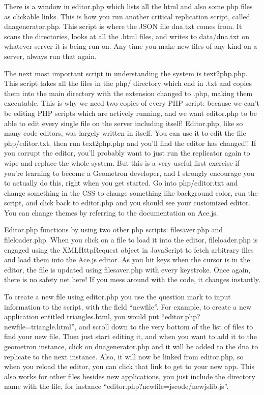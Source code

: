 There is a window in editor.php which lists all the html and also some php files as clickable links.  This is how you run another critical replication script, called dnagenerator.php.  This script is where the JSON file dna.txt comes from.  It scans the directories, looks at all the .html files, and writes to data/dna.txt on whatever server it is being run on.  Any time you make new files of any kind on a server, always run that again.  

The next most important script in understanding the system is text2php.php.  This script takes all the files in the php/ directory which end in .txt and copies them into the main directory with the extension changed to .php, making them executable.  This is why we need two copies of every PHP script: because we can't be editing PHP scripts which are actively running, and we want editor.php to be able to edit every single file on the server including itself! Editor.php, like so many code editors, was largely written in itself.  You can use it to edit the file php/editor.txt, then run text2php.php and you'll find the editor has changed!! If you corrupt the editor, you'll probably want to just run the replicator again to wipe and replace the whole system.  But this is a very useful first exercise if you're learning to become a Geometron developer, and I strongly encourage you to actually do this, right when you get started.  Go into php/editor.txt and change something in the CSS to change something like background color, run the script, and click back to editor.php and you should see your customized editor. You can change themes by referring to the documentation on Ace.js.

Editor.php functions by using two other php scripts: filesaver.php and fileloader.php.  When you click on a file to load it into the editor, fileloader.php is engaged using the XMLHttpRequest object in JavaScript to fetch arbitrary files and load them into the Ace.js editor.  As you hit keys when the cursor is in the editor, the file is updated using filesaver.php with every keystroke.  Once again, there is no safety net here! If you mess around with the code, it changes instantly.

To create a new file using editor.php you use the question mark to input information to the script, with the field ``newfile''. For example, to create a new application entitled triangles.html, you would put ``editor.php?newfile=triangle.html'', and scroll down to the very bottom of the list of files to find your new file.  Then just start editing it, and when you want to add it to the geometron instance, click on dnagenerator.php and it will be added to the dna to replicate to the next instance. Also, it will now be linked from editor.php, so when you reload the editor, you can click that link to get to your new app.   This also works for other files besides new applications, you just include the directory name with the file, for instance ``editor.php?newfile=jscode/newjslib.js''.  


